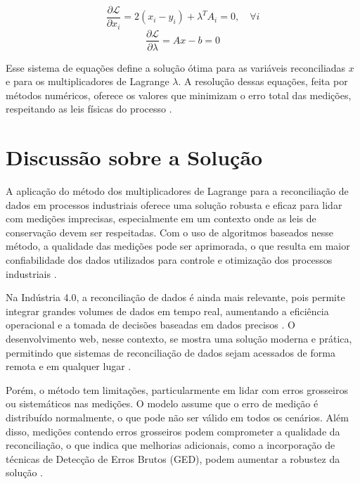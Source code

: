 \[
\frac{\partial \mathcal{L}}{\partial x_i} = 2(x_i - y_i) + \lambda^T A_i = 0, \quad \forall i
\]
\[
\frac{\partial \mathcal{L}}{\partial \lambda} = Ax - b = 0
\]

Esse sistema de equações define a solução ótima para as variáveis reconciliadas $x$ e para os multiplicadores de Lagrange $\lambda$. A resolução dessas equações, feita por métodos numéricos, oferece os valores que minimizam o erro total das medições, respeitando as leis físicas do processo \cite{lagrangerecon}.

\section{Discussão sobre a Solução}
\label{Sec:DiscussaoSolucao}

A aplicação do método dos multiplicadores de Lagrange para a reconciliação de dados em processos industriais oferece uma solução robusta e eficaz para lidar com medições imprecisas, especialmente em um contexto onde as leis de conservação devem ser respeitadas. Com o uso de algoritmos baseados nesse método, a qualidade das medições pode ser aprimorada, o que resulta em maior confiabilidade dos dados utilizados para controle e otimização dos processos industriais \cite{reconciliationalgorithms}.

Na Indústria 4.0, a reconciliação de dados é ainda mais relevante, pois permite integrar grandes volumes de dados em tempo real, aumentando a eficiência operacional e a tomada de decisões baseadas em dados precisos \cite{datareconciliationindustry4}. O desenvolvimento web, nesse contexto, se mostra uma solução moderna e prática, permitindo que sistemas de reconciliação de dados sejam acessados de forma remota e em qualquer lugar \cite{websolutions}.

Porém, o método tem limitações, particularmente em lidar com erros grosseiros ou sistemáticos nas medições. O modelo assume que o erro de medição é distribuído normalmente, o que pode não ser válido em todos os cenários. Além disso, medições contendo erros grosseiros podem comprometer a qualidade da reconciliação, o que indica que melhorias adicionais, como a incorporação de técnicas de Detecção de Erros Brutos (GED), podem aumentar a robustez da solução \cite{dataerrorsystems}.

